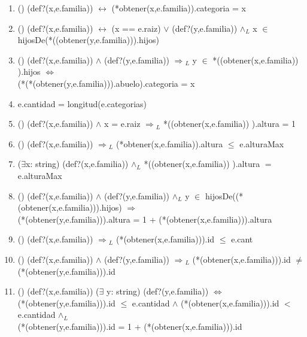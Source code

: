 \documentclass[10pt, a4paper]{article}
\begin{document}
	   \begin{enumerate}

	    \item() (def?(x,e.familia)) $\leftrightarrow$ (*obtener(x,e.familia)).categoria = x  
	  
	    \item() (def?(x,e.familia)) $\leftrightarrow$ (x == e.raiz) $\vee$ (def?(y,e.familia)) $\wedge{_L}$ x $\in$ hijosDe(*((obtener(y,e.familia))).hijos)
	       
	    \item () (def?(x,e.familia)) $\wedge$ (def?(y,e.familia)) $\Rightarrow{_L}$ y $\in$ *((obtener(x,e.familia)) ).hijos $\Leftrightarrow$ \\ (*(*(obtener(y,e.familia))).abuelo).categoria = x

	    \item e.cantidad  = longitud(e.categorias)
	    
	    \item () (def?(x,e.familia)) $\wedge$ x = e.raiz $\Rightarrow{_L}$ *((obtener(x,e.familia)) ).altura = 1
	    
	    \item () (def?(x,e.familia)) $\Rightarrow{_L}$ (*obtener(x,e.familia)).altura $\leq$ e.alturaMax
	    
	    \item ($\exists$x: string) (def?(x,e.familia)) $\wedge{_L}$ *((obtener(x,e.familia)) ).altura $=$ e.alturaMax
	    
	    \item () (def?(x,e.familia)) $\wedge$ (def?(y,e.familia)) $\wedge{_L}$ y $\in$ hijosDe((*(obtener(x,e.familia))).hijos) $\Rightarrow$ \\ (*(obtener(y,e.familia))).altura = 1 + (*(obtener(x,e.familia))).altura
	    
	    \item () (def?(x,e.familia)) $\Rightarrow{_L}$ (*(obtener(x,e.familia))).id $\leq$ e.cant
	    
	    \item () (def?(x,e.familia)) $\wedge$ (def?(y,e.familia)) $\Rightarrow{_L}$ (*(obtener(x,e.familia))).id $\neq$ (*(obtener(y,e.familia))).id
	    
	    \item () (def?(x,e.familia)) ($\exists$ y: string) (def?(y,e.familia)) $\Leftrightarrow$ \\ (*(obtener(y,e.familia))).id $\leq$ e.cantidad $\wedge$ (*(obtener(x,e.familia))).id $<$ e.cantidad $\wedge{_L}$ \\(*(obtener(y,e.familia))).id = 1 + (*(obtener(x,e.familia))).id
	    
\end{enumerate}
\end{document}
